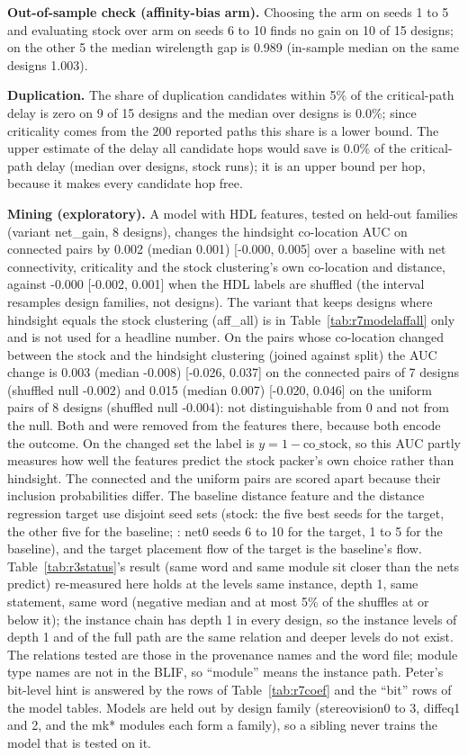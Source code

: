 \textbf{Out-of-sample check (affinity-bias arm).} Choosing the arm on seeds 1 to 5 and evaluating stock over arm on seeds 6 to 10 finds no gain on 10 of 15 designs; on the other 5 the median wirelength gap is 0.989 (in-sample median on the same designs 1.003).

\textbf{Duplication.} The share of duplication candidates within 5\% of the critical-path delay is zero on 9 of 15 designs and the median over designs is 0.0\%; since criticality comes from the 200 reported
paths this share is a lower bound. The upper estimate of the delay all candidate hops would save is 0.0\% of the critical-path delay (median over designs, stock runs); it is an upper bound per hop, because it makes every candidate hop free.

\textbf{Mining (exploratory).} A model with HDL features, tested on held-out families (variant net\_gain, 8 designs), changes the hindsight co-location AUC on connected pairs by 0.002 (median 0.001) [-0.000, 0.005] over a baseline with net connectivity, criticality and the stock clustering's own co-location and distance, against -0.000 [-0.002, 0.001] when the HDL labels are shuffled (the interval resamples design families, not designs). The variant that keeps designs where hindsight equals the stock clustering (aff\_all) is in Table~\ref{tab:r7modelaffall} only and is not used for a headline number. On the pairs whose co-location changed between the stock and the hindsight clustering (joined against split) the AUC change is 0.003 (median -0.008) [-0.026, 0.037] on the connected pairs of 7 designs (shuffled null -0.002) and 0.015 (median 0.007) [-0.020, 0.046] on the uniform pairs of 8 designs (shuffled null -0.004): not distinguishable from 0 and not from the null. Both  and  were removed from the features there, because both encode the outcome. On the changed set the label is $y = 1 - \mathrm{co\_stock}$, so this AUC partly measures how well the features predict the stock packer's own choice rather than hindsight. The connected and the uniform pairs are scored apart because their inclusion probabilities differ. The baseline distance feature and the distance regression target use disjoint seed sets (stock: the five best seeds for the target, the other five for the baseline; : net0 seeds 6 to 10 for the target, 1 to 5 for the baseline), and the target placement flow of the  target is the baseline's flow. Table~\ref{tab:r3status}'s result (same word and same module sit closer than the nets predict) re-measured here holds at the levels
same instance, depth 1, same statement, same word (negative median and at most 5\% of the shuffles at or below it); the instance chain has depth 1 in every design, so the instance levels of depth 1 and of the full path are the same relation and deeper levels do not exist. The relations tested are those in
the provenance names and the word file; module type names are not in the BLIF, so ``module'' means the instance path. Peter's bit-level hint is
answered by the rows of Table~\ref{tab:r7coef} and the ``bit'' rows of the model tables. Models are held out by design family (stereovision0 to 3, diffeq1 and 2, and the mk* modules each form a family), so a
sibling never trains the model that is tested on it.

